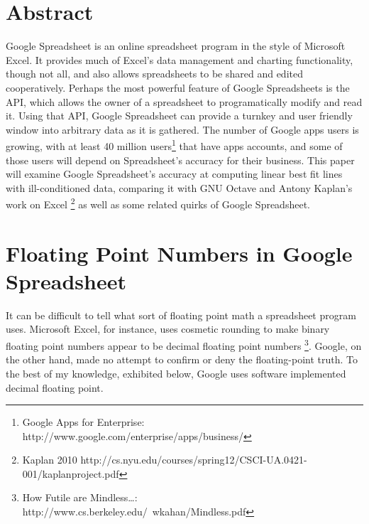 \documentclass{article}
\title{\cTitle}
\author{\cAuthor}
\begin{document}
\maketitle

\section*{Abstract}
Google Spreadsheet is an online spreadsheet program in the style of Microsoft Excel.
It provides much of Excel's data management and charting functionality, though not all,
and also allows spreadsheets to be shared and edited cooperatively.
Perhaps the most powerful feature of Google Spreadsheets is the API,
which allows the owner of a spreadsheet to programatically modify and read it.
Using that API, Google Spreadsheet can provide a turnkey and user friendly window into
arbitrary data as it is gathered.  The number of Google apps users is growing,
with at least 40 million users\footnote{Google Apps for Enterprise: http://www.google.com/enterprise/apps/business/}
that have apps accounts, and some of those users
will depend on Spreadsheet's accuracy for their business.  This paper will examine
Google Spreadsheet's accuracy at computing linear best fit lines with ill-conditioned data,
comparing it with GNU Octave and Antony Kaplan's work on Excel
\footnote{Kaplan 2010 http://cs.nyu.edu/courses/spring12/CSCI-UA.0421-001/kaplanproject.pdf}
as well as some related quirks of Google Spreadsheet.
\newpage
\section*{Floating Point Numbers in Google Spreadsheet}
It can be difficult to tell what sort of floating point math a spreadsheet program uses.
Microsoft Excel, for instance, uses cosmetic rounding to make binary floating point numbers
appear to be decimal floating point numbers
\footnote{How Futile are Mindless\dots: http://www.cs.berkeley.edu/~wkahan/Mindless.pdf}.
Google, on the other hand, made no attempt to confirm or deny the floating-point truth.
To the best of my knowledge, exhibited below, Google uses software implemented decimal floating point.\\
\end{document}
